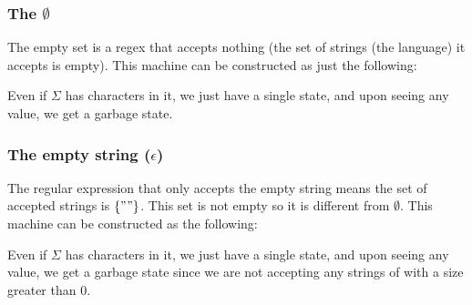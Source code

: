 \documentclass[main.tex]{subfiles}
\begin{document}
\subsubsection{The $\emptyset$}
The empty set is a regex that accepts nothing (the set of strings (the language) it accepts is empty). This machine can be constructed as just the following:
\begin{center}
\end{center}
Even if $\Sigma$ has characters in it, we just have a single state, and upon seeing any value, we get a garbage state. 

\subsubsection{The empty string ($\epsilon$)}
The regular expression that only accepts the empty string means the set of accepted strings is $\{""\}$. This set is not empty so it is different from $\emptyset$. This machine can be constructed as the following: 
\begin{center}
\end{center}
Even if $\Sigma$ has characters in it, we just have a single state, and upon seeing any value, we get a garbage state since we are not accepting any strings of with a size greater than 0.
\end{document}
